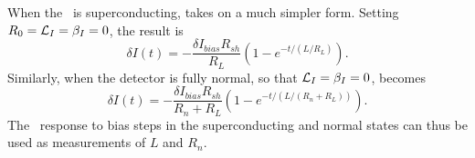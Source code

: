 When the \TES\ is superconducting,  takes on a much simpler form.
Setting $R_0 = \mathcal{L}_I = \beta_I = 0$, the result is
\begin{equation}\label{eqn:bias-step-resp-sc}
\delta I(t)
   = - \frac{\delta I_{bias} R_{sh}}{R_{L}} 
       \left(1 - e^{-t/(L/R_L)} \right).
\end{equation}
Similarly, when the detector is fully normal, so that $\mathcal{L}_I = \beta_I = 0$,  becomes
\begin{equation}\label{eqn:bias-step-resp-normal}
\delta I(t)
   = - \frac{\delta I_{bias} R_{sh}}{R_n + R_{L}} 
       \left(1 - e^{-t/(L/(R_n+R_L))} \right).
\end{equation}
The \TES\ response to bias steps in the superconducting and normal states can thus be used as measurements of $L$ and $R_n$.

